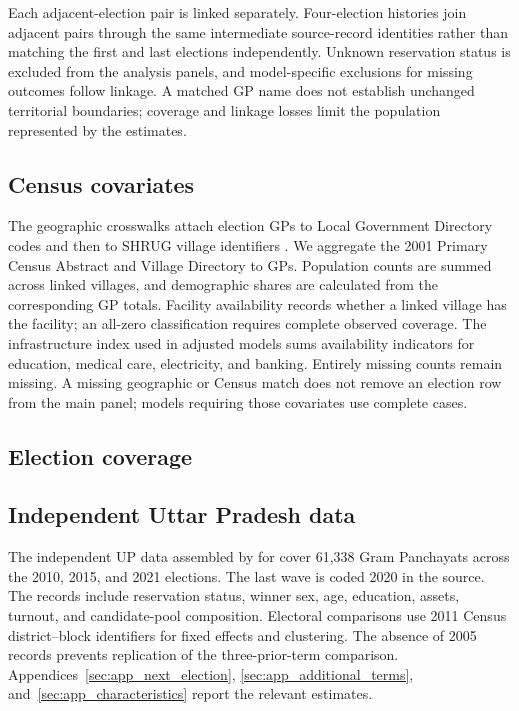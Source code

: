 Each adjacent-election pair is linked separately. Four-election histories join adjacent pairs through the same intermediate source-record identities rather than matching the first and last elections independently. Unknown reservation status is excluded from the analysis panels, and model-specific exclusions for missing outcomes follow linkage. A matched GP name does not establish unchanged territorial boundaries; coverage and linkage losses limit the population represented by the estimates.

\subsection{Census covariates}

The geographic crosswalks attach election GPs to Local Government Directory codes and then to SHRUG village identifiers \citep{asher2019socioeconomic}. We aggregate the 2001 Primary Census Abstract and Village Directory to GPs. Population counts are summed across linked villages, and demographic shares are calculated from the corresponding GP totals. Facility availability records whether a linked village has the facility; an all-zero classification requires complete observed coverage. The infrastructure index used in adjusted models sums availability indicators for education, medical care, electricity, and banking. Entirely missing counts remain missing. A missing geographic or Census match does not remove an election row from the main panel; models requiring those covariates use complete cases.

\subsection{Election coverage}


\FloatBarrier


\subsection{Independent Uttar Pradesh data}\label{sec:weaver}

The independent UP data assembled by \citet{weaver_data} for \citet{narasimhan2024polity} cover 61,338 Gram Panchayats across the 2010, 2015, and 2021 elections. The last wave is coded 2020 in the source. The records include reservation status, winner sex, age, education, assets, turnout, and candidate-pool composition. Electoral comparisons use 2011 Census district--block identifiers for fixed effects and clustering. The absence of 2005 records prevents replication of the three-prior-term comparison. Appendices~\ref{sec:app_next_election}, \ref{sec:app_additional_terms}, and~\ref{sec:app_characteristics} report the relevant estimates.
